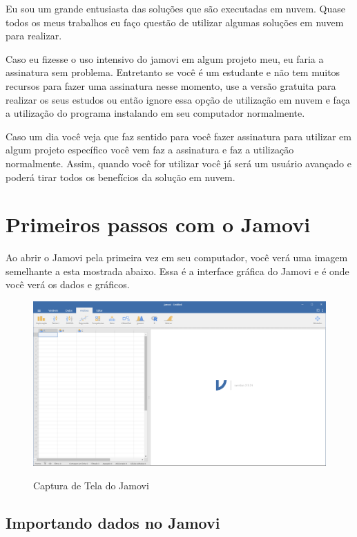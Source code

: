 Eu sou um grande entusiasta das soluções que são executadas em nuvem. Quase todos os meus trabalhos eu faço questão de utilizar algumas soluções em nuvem para realizar.

Caso eu fizesse o uso intensivo do jamovi em algum projeto meu, eu faria a assinatura sem problema. Entretanto se você é um estudante e não tem muitos recursos para fazer uma assinatura nesse momento, use a versão gratuita para realizar os seus estudos ou então ignore essa opção de utilização em nuvem e faça a utilização do programa instalando em seu computador normalmente.

Caso um dia você veja que faz sentido para você fazer assinatura para utilizar em algum projeto específico você vem faz a assinatura e faz a utilização normalmente. Assim, quando você for utilizar você já será um usuário avançado e poderá tirar todos os benefícios da solução em nuvem.

\section{Primeiros passos com o Jamovi}

Ao abrir o Jamovi pela primeira vez em seu computador, você verá uma imagem semelhante a esta mostrada abaixo. Essa é a interface gráfica do Jamovi e é onde você verá os dados e gráficos.

\begin{figure}[H]
  \centering
  \caption{Captura de Tela do Jamovi}
  \includegraphics[width=\textwidth]{imagens/cap_1/captura_tela_jamovi.png}
  \label{fig:captura_tela_jamovi}
\end{figure}

\subsection{Importando dados no Jamovi}

